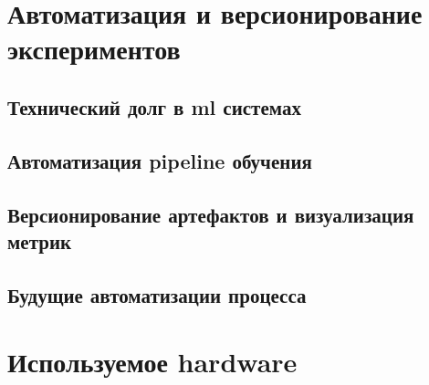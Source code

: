 
\chapter{Автоматизация и версионирование экспериментов}
\section{Технический долг в \acrshort{ml} системах}
\section{Автоматизация \gls{pipeline} обучения}
\section{Версионирование артефактов и визуализация метрик}
\section{Будущие автоматизации процесса}
\appendix
\chapter{Используемое hardware}
